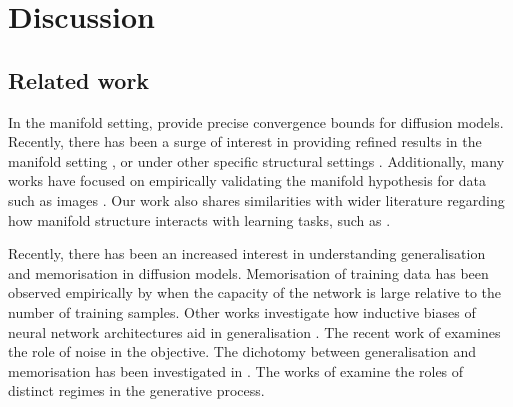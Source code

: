 \documentclass[10pt]{article}
\theoremstyle{plain}
\theoremstyle{definition}
\theoremstyle{remark}
\begin{document}
\section{Discussion}


\subsection{Related work}



In the manifold setting, \citet{pidstrigach2022scorebased, de_bortoli2022convergence} provide precise convergence bounds for diffusion models. Recently, there has been a surge of interest in providing refined results in the manifold setting \citep{oko23_minimax, chen23_scoreapproxlowdim, tang24_adaptmanifold,  li2024adapting, azangulov2024convergencediffusionmodelsmanifold, potaptchik2024linearconvergencediffusionmodels}, or under other specific structural settings \citep{shah2023learning, chen2024learninggeneralgaussianmixtures, wang2024diffusionmodelslearnlowdimensional}.
Additionally, many works have focused on empirically validating the manifold hypothesis for data such as images \citep{Fefferman16_testingmanifoldhypothesis, pope21_intrinsicdim, stanczuk2024diffusion, brown2023verifying, kamkari24_flipd}. Our work also shares similarities with wider literature regarding how manifold structure interacts with learning tasks, such as \citet{genovese12_minimaxmanifold,Cheng13_locallinearregression,moscovich17a_minimax,Gao222_adaptivemanifold}.


Recently, there has been an increased interest in understanding generalisation and memorisation in diffusion models. Memorisation of training data has been observed empirically by \citet{somepalli2023_diffusionforgery, Carlini23_extract_training} when the capacity of the network is large relative to the number of training samples. Other works investigate how inductive biases of neural network architectures aid in generalisation \citep{kadkhodaie2024generalization, niedoba2024mechanisticexplanationdiffusionmodel, kamb2024_creativity}. The recent work of \citet{vastola2025generalization} examines the role of noise in the objective. The dichotomy between generalisation and memorisation has been investigated in \citet{yoon2023diffusion, gu2023memorizationdiffusionmodels, wen2024detecting, zhang2024_emergence, baptista2025memorization}. The works of \citet{raya2023spontaneous, Biroli_2024, ventura2025manifoldsrandommatricesspectral} examine the roles of distinct regimes in the generative process.
\end{document}
